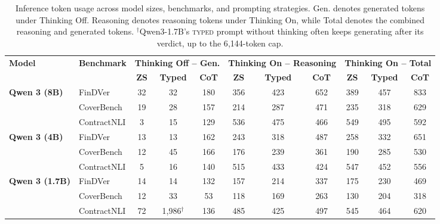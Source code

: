 \documentclass[11pt]{article}
\newcommand{\typed}{\textsc{typed}}
\begin{document}
\begin{table}[H]
\centering
\scriptsize
\setlength{\tabcolsep}{4pt}
\renewcommand{\arraystretch}{1.08}

\begin{tabular}{llccc|ccc|ccc}
\toprule
\multirow{2}{*}{\textbf{Model}} &
\multirow{2}{*}{\textbf{Benchmark}} &
\multicolumn{3}{c|}{\textbf{Thinking Off -- Gen.}} &
\multicolumn{3}{c|}{\textbf{Thinking On -- Reasoning}} &
\multicolumn{3}{c}{\textbf{Thinking On -- Total}} \\

\cmidrule(lr){3-5}
\cmidrule(lr){6-8}
\cmidrule(lr){9-11}

&
&
\textbf{ZS} & \textbf{Typed} & \textbf{CoT}
&
\textbf{ZS} & \textbf{Typed} & \textbf{CoT}
&
\textbf{ZS} & \textbf{Typed} & \textbf{CoT}
\\
\midrule

\multirow{3}{*}{\textbf{Qwen 3 (8B)}}
& FinDVer
& 32 & 32 & 180
& 356 & 423 & 652
& 389 & 457 & 833
\\
& CoverBench
& 19 & 28 & 157
& 214 & 287 & 471
& 235 & 318 & 629
\\
& ContractNLI
& 3 & 15 & 129
& 536 & 475 & 466
& 549 & 495 & 592
\\

\midrule

\multirow{3}{*}{\textbf{Qwen 3 (4B)}}
& FinDVer
& 13 & 13 & 162
& 243 & 318 & 487
& 258 & 332 & 651
\\
& CoverBench
& 12 & 45 & 166
& 176 & 239 & 361
& 190 & 285 & 530
\\
& ContractNLI
& 5 & 16 & 140
& 515 & 433 & 424
& 547 & 452 & 556
\\

\midrule

\multirow{3}{*}{\textbf{Qwen 3 (1.7B)}}
& FinDVer
& 14 & 14 & 132
& 157 & 214 & 337
& 175 & 230 & 469
\\
& CoverBench
& 12 & 33 & 53
& 118 & 169 & 263
& 130 & 204 & 318
\\
& ContractNLI
& 72 & 1{,}986$^{\dagger}$ & 136
& 485 & 425 & 497
& 545 & 464 & 620
\\

\bottomrule
\end{tabular}

\caption{Inference token usage across model sizes, benchmarks, and prompting strategies. Gen. denotes generated tokens under Thinking Off. Reasoning denotes reasoning tokens under Thinking On, while Total denotes the combined reasoning and generated tokens. $^{\dagger}$Qwen3-1.7B's \typed{} prompt without thinking often keeps generating after its verdict, up to the 6{,}144-token cap.}
\label{tab:tokens}
\end{table}
\end{document}
